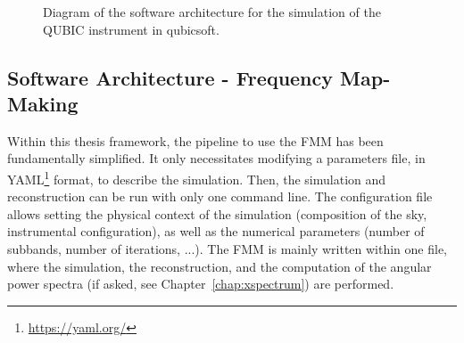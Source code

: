 \documentclass[../../thesis.tex]{subfiles}
\begin{document}
\begin{figure}[htbp]
{%
}
\caption{Diagram of the software architecture for the simulation of the QUBIC instrument in qubicsoft.}
\label{fig:diagram_qubicsoft}
\end{figure}

\subsection{Software Architecture - Frequency Map-Making}

Within this thesis framework, the pipeline to use the FMM has been fundamentally simplified. It only necessitates modifying a parameters file, in YAML\footnote{\url{https://yaml.org/}} format, to describe the simulation. Then, the simulation and reconstruction can be run with only one command line. 
The configuration file allows setting the physical context of the simulation (composition of the sky, instrumental configuration), as well as the numerical parameters (number of subbands, number of iterations, ...). The FMM is mainly written within one file, where the simulation, the reconstruction, and the computation of the angular power spectra (if asked, see Chapter~\ref{chap:xspectrum}) are performed.
\end{document}
